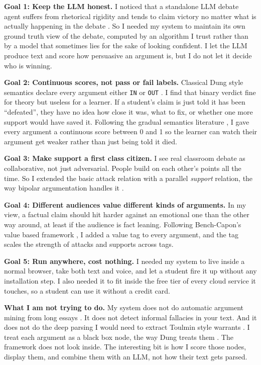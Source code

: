 \textbf{Goal 1: Keep the LLM honest.}
I noticed that a standalone LLM debate agent suffers from rhetorical rigidity \cite{ku2025multiagent} and tends to claim victory no matter what is actually happening in the debate \cite{aoyagui2025subjective}. So I needed my system to maintain its own ground truth view of the debate, computed by an algorithm I trust rather than by a model that sometimes lies for the sake of looking confident. I let the LLM produce text and score how persuasive an argument is, but I do not let it decide who is winning.

\textbf{Goal 2: Continuous scores, not pass or fail labels.}
Classical Dung style semantics declare every argument either \texttt{IN} or \texttt{OUT} \cite{dung1995acceptability}. I find that binary verdict fine for theory but useless for a learner. If a student's claim is just told it has been ``defeated'', they have no idea how close it was, what to fix, or whether one more support would have saved it. Following the gradual semantics literature \cite{cayrol2005graduality, amgoud2017gradual}, I gave every argument a continuous score between 0 and 1 so the learner can watch their argument get weaker rather than just being told it died.

\textbf{Goal 3: Make support a first class citizen.}
I see real classroom debate as collaborative, not just adversarial. People build on each other's points all the time. So I extended the basic attack relation with a parallel \emph{support} relation, the way bipolar argumentation handles it \cite{cayrol2005bipolar}.

\textbf{Goal 4: Different audiences value different kinds of arguments.}
In my view, a factual claim should hit harder against an emotional one than the other way around, at least if the audience is fact leaning. Following Bench-Capon's value based framework \cite{benchcapon2003value}, I added a value tag to every argument, and the tag scales the strength of attacks and supports across tags.

\textbf{Goal 5: Run anywhere, cost nothing.}
I needed my system to live inside a normal browser, take both text and voice, and let a student fire it up without any installation step. I also needed it to fit inside the free tier of every cloud service it touches, so a student can use it without a credit card.

\textbf{What I am not trying to do.}
My system does not do automatic argument mining from long essays \cite{wachsmuth2016essays}. It does not detect informal fallacies in your text. And it does not do the deep parsing I would need to extract Toulmin style warrants \cite{toulmin2003uses}. I treat each argument as a black box node, the way Dung treats them \cite{dung1995acceptability}. The framework does not look inside. The interesting bit is how I score those nodes, display them, and combine them with an LLM, not how their text gets parsed.

